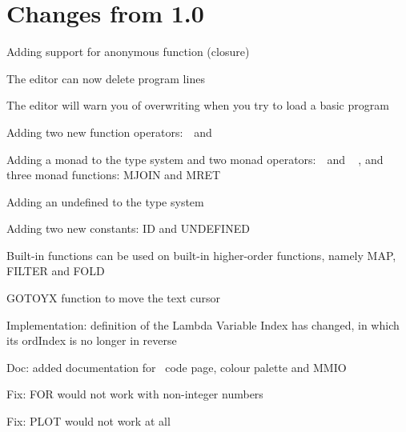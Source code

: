 \chapter{Changes from 1.0}

\begin{itemlist}
\item Adding support for anonymous function (closure)
\item The editor can now delete program lines
\item The editor will warn you of overwriting when you try to load a basic program
\item Adding two new function operators: \basicapply\ \,and\ \,\basiccompo
\item Adding a monad to the type system and two monad operators: \basicmbind\ \,and\ \,\basicmseq\ , and three monad functions: MJOIN and MRET
\item Adding an undefined to the type system
\item Adding two new constants: ID and UNDEFINED
\item Built-in functions can be used on built-in higher-order functions, namely MAP, FILTER and FOLD
\item GOTOYX function to move the text cursor
\item Implementation: definition of the Lambda Variable Index has changed, in which its ordIndex is no longer in reverse
\item Doc: added documentation for \thismachine\ code page, colour palette and MMIO
\item Fix: FOR would not work with non-integer numbers
\item Fix: PLOT would not work at all
\end{itemlist}

